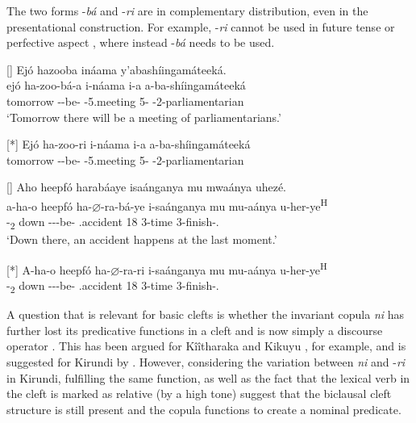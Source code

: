 \documentclass[output=paper]{langscibook}
\begin{document}
\z

The two forms -\textit{bá} and -\textit{ri} are in complementary distribution, even in the presentational construction. For example, -\textit{ri} cannot be used in future tense  or perfective aspect , where instead -\textit{bá} needs to be used.

\ea
\label{bkm:Ref75258689}
\ea
[]{
Ejó hazooba ináama y’abashíingamáteeká.\\
\gll
ejó  ha-zoo-bá-a  i-náama  i-a  a-ba-shíingamáteeká\\
tomorrow  \EXP{}-\FUT{}-be-\FV{}  \AUG{}-5.meeting  5-\CONN{}  \AUG{}-2-parliamentarian\\
\glt
‘Tomorrow there will be a meeting of parliamentarians.’\\
}

\ex
[*]{
\gll
Ejó  ha-zoo-ri  i-náama  i-a  a-ba-shíingamáteeká\\
tomorrow  \EXP{}-\FUT{}-be-\FV{}  \AUG{}-5.meeting  5-\CONN{}  \AUG{}-2-parliamentarian\\
\glt
}

\z
\ex
\label{bkm:Ref75258679}

\ea
[]{
Aho heepfó harabáaye isaánganya mu mwaánya uhezé.\\
\gll
a-ha-o  heepfó  ha-$\varnothing$-ra-bá-ye  i-saánganya  mu  mu-aánya   u-her-ye\textsuperscript{H}\\
-\DEM{}\textsubscript{2}  down  \EXP-\PRS-\DJ-{}be-\PFV{}  .accident  18  3-time   3\SM{}-finish-\PFV.\REL{}\\
\glt
  ‘Down there, an accident happens at the last moment.’\\
}

\ex
[*]{
\gll
A-ha-o  heepfó  ha-$\varnothing$-ra-ri  i-saánganya  mu  mu-aánya  u-her-ye\textsuperscript{H}\\
-\DEM{}\textsubscript{2}  down  \EXP-\PRS-\DJ-{}be-\PFV{}  .accident  18  3-time  3\SM{}-finish-\PFV.\REL{}\\
\glt
}

\z
\z

A question that is relevant for basic clefts is whether the invariant copula \textit{ni} has further lost its predicative functions in a cleft and is now simply a discourse operator \citep{Lambrecht1994,Muller2002,Blanche-Benvensite2002}. This has been argued for Kîîtharaka \citep{AbelsMuriungi2008} and Kikuyu \citep{Schwarz2007}, for example, and is suggested for Kirundi by \citet{LafkiouiEtAl2016}. However, considering the variation between \textit{ni} and -\textit{ri} in Kirundi, fulfilling the same function, as well as the fact that the lexical verb in the cleft is marked as relative (by a high tone) suggest that the biclausal cleft structure is still present and the copula functions to create a nominal predicate.
\end{document}
